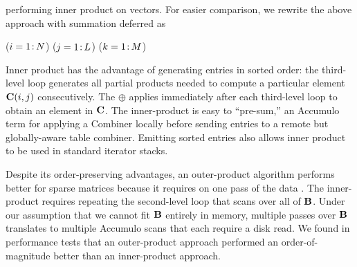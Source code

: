 \noindent %
performing inner product on vectors.
For easier comparison, we rewrite the above approach with summation deferred as

\removelatexerror
\begin{algorithm}[H]
\vspace{\algspace}
\fore($i = 1\colon\! N$){
\fore($j = 1\colon\! L$){
\fore($k = 1\colon\! M$){
}}}
\vspace{\algspace}
\end{algorithm}

Inner product has the advantage of generating entries in sorted order:
the third-level loop generates all partial products needed 
to compute a particular element $\mathbf{C}(i,j)$ consecutively.
The $\oplus$ applies immediately after each third-level loop to obtain an element in $\mathbf{C}$.
The inner-product is easy to ``pre-sum,'' an Accumulo term for applying a Combiner
locally before sending entries to a remote but globally-aware table combiner.
Emitting sorted entries also allows inner product to be used in standard iterator stacks.

Despite its order-preserving advantages, an outer-product algorithm performs better for sparse matrices 
because it requires on one pass of the data \cite{burkhardt2013big}\cite{burkhardt2014asking}.  The inner-product requires repeating
the second-level loop that scans over all of $\mathbf{B}$.
Under our assumption that we cannot fit $\mathbf{B}$ entirely in memory,
multiple passes over $\mathbf{B}$ translates to multiple Accumulo scans that each require a disk read.
We found in performance tests that an outer-product approach performed an order-of-magnitude better than an inner-product approach.

